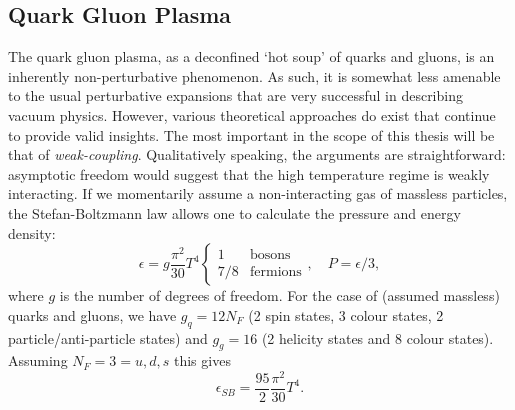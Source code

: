 \documentclass[11pt, a4paper, twoside]{book}
\begin{document}
\subsection{Quark Gluon Plasma}
\label{sec:QGP}
The quark gluon plasma, as a deconfined `hot soup' of quarks and gluons, is an inherently non-perturbative phenomenon. As such, it is somewhat less amenable to the usual perturbative expansions that are very successful in describing vacuum physics. However, various theoretical approaches do exist that continue to provide valid insights. The most important in the scope of this thesis will be that of \emph{weak-coupling}. Qualitatively speaking, the arguments are straightforward: asymptotic freedom would suggest that the high temperature regime is weakly interacting. If we momentarily assume a non-interacting gas of massless particles, the Stefan-Boltzmann law allows one to calculate the pressure and energy density:
\begin{equation}
\label{eq:SBres}
\epsilon=g\frac{\pi^2}{30}T^4\begin{cases}
    1 & \text{bosons}\\
    7/8 & \text{fermions}
  \end{cases},\quad P=\epsilon/3,
\end{equation}
where \(g\) is the number of degrees of freedom. For the case of (assumed massless) quarks and gluons, we have \(g_q=12N_F\) (2 spin states, 3 colour states, 2 particle/anti-particle states) and \(g_g=16\) (2 helicity states and 8 colour states). Assuming \(N_F=3=u,d,s\) this gives
\begin{equation}
\label{eq:SB_pres}
\epsilon_{SB}=\frac{95}{2}\frac{\pi^2}{30}T^4.
\end{equation}
\end{document}
